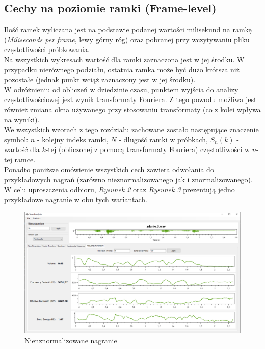 \documentclass[a4paper]{article}
\begin{document}
\subsection{Cechy na poziomie ramki (Frame-level)}
Ilość ramek wyliczana jest na podstawie podanej wartości milisekund na ramkę (\textit{Miliseconds per frame}, lewy górny róg) oraz pobranej przy wczytywaniu pliku częstotliwości próbkowania.\\
Na wszystkich wykresach wartość dla ramki zaznaczona jest w jej środku. W przypadku nierównego podziału, ostatnia ramka może być dużo krótsza niż pozostałe (jednak punkt wciąż zaznaczony jest w jej środku).\\
W odróżnieniu od obliczeń w dziedzinie czasu, punktem wyjścia do analizy częstotliwościowej jest wynik transformaty Fouriera. Z tego powodu możliwa jest również zmiana okna używanego przy stosowaniu transformaty (co z kolei wpływa na wyniki).\\
We wszystkich wzorach z tego rozdziału zachowane zostało następujące znaczenie symbol: \textit{$n$} - kolejny indeks ramki, \textit{$N$} - długość ramki w próbkach, \textit{$S_n(k)$} - wartość dla $k$-tej (obliczonej z pomocą transformaty Fouriera) częstotliwości w $n$-tej ramce.\\
Ponadto poniższe omówienie wszystkich cech zawiera odwołania do przykładowych nagrań (zarówno nieznormalizowanego jak i znormalizowanego). W celu uproszczenia odbioru, \textit{Rysunek 2} oraz \textit{Rysunek 3} prezentują jedno przykładowe nagranie w obu tych wariantach.
\begin{figure}[H]
  \includegraphics[width=\linewidth]{images/02notnormalized.png}
  \caption{Nienznormalizowane nagranie}
\end{figure}
\end{document}
